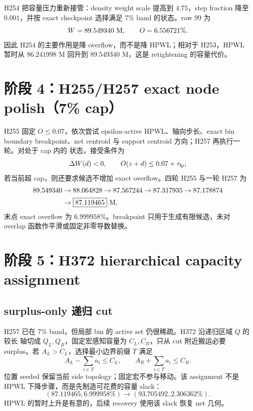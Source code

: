 \documentclass[UTF8,11pt,a4paper]{ctexart}
\begin{document}
H254 把容量压力重新接管：density weight scale 提高到 $4.75$，step fraction 降至
$0.001$，并按 exact checkpoint 选择满足 7\% band 的状态。row 99 为
\[
 W=89.549340\ {\rm M},\qquad O=6.556721\%.
\]
因此 H254 的主要作用是降 overflow，而不是降 HPWL；相对于 H253，HPWL 暂时从
$86.241998$ M 回升到 $89.549340$ M，这是 retightening 的容量代价。

\section{阶段 4：H255/H257 exact node polish（7\% cap）}

H255 固定 $O\le0.07$，依次尝试 epsilon-active HPWL、轴向步长、exact bin boundary
breakpoint、net centroid 与 support centroid 方向；H257 再执行一轮。对处于 cap 内的
状态，接受条件为
\begin{equation}
 \Delta W(d)<0,\qquad O(z+d)\le0.07+\tau_{\rm fp};
 \label{eq:cap7accept}
\end{equation}
若当前超 cap，则还要求候选不增加 exact overflow。四轮 H255 与一轮 H257 为
\begin{align}
 89.549340&\rightarrow88.064828\rightarrow87.567244\rightarrow87.317935
 \rightarrow87.178874\\
 &\rightarrow\boxed{87.119465}\ {\rm M},
 \label{eq:polishresult}
\end{align}
末点 exact overflow 为 $6.999958\%$。breakpoint 只用于生成有限候选，未对 overlap
函数作平滑或固定非零导数替换。

\section{阶段 5：H372 hierarchical capacity assignment}

\subsection{surplus-only 递归 cut}
H257 已在 7\% band，但局部 bin 的 active set 仍很稀疏。H372 沿递归区域 $Q$ 的较长
轴切成 $Q_L,Q_R$，固定宏感知容量为 $C_L,C_R$，只从 cut 附近搬运必要 surplus。若
$A_L>C_L$，选择最小边界前缀 $T$ 满足
\begin{equation}
 A_L-\sum_{i\in T}a_i\le C_L,\qquad
 A_R+\sum_{i\in T}a_i\le C_R.
 \label{eq:surplus}
\end{equation}
位置 seeded 保留当前 side topology；固定宏不参与移动。该 assignment 不是 HPWL
下降步骤，而是先制造可花费的容量 slack：
\[
 (87.119465,6.999958\%)
 \longrightarrow(93.705492,2.306362\%).
\]
HPWL 的暂时上升是有意的，后续 recovery 使用该 slack 恢复 net 几何。
\end{document}
